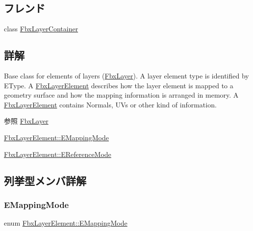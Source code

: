 \subsection*{フレンド}
\begin{DoxyCompactItemize}
\item 
class \hyperlink{class_fbx_layer_element_a791d2046ce60bf6f5fb85d9dc6242f2e}{Fbx\+Layer\+Container}
\end{DoxyCompactItemize}


\subsection{詳解}
Base class for elements of layers (\hyperlink{class_fbx_layer}{Fbx\+Layer}). A layer element type is identified by E\+Type. A \hyperlink{class_fbx_layer_element}{Fbx\+Layer\+Element} describes how the layer element is mapped to a geometry surface and how the mapping information is arranged in memory. A \hyperlink{class_fbx_layer_element}{Fbx\+Layer\+Element} contains Normals, U\+Vs or other kind of information.

\begin{DoxySeeAlso}{参照}
\hyperlink{class_fbx_layer}{Fbx\+Layer} 

\hyperlink{class_fbx_layer_element_a5a40e95db30ae9f94611dc3f1568af26}{Fbx\+Layer\+Element\+::\+E\+Mapping\+Mode} 

\hyperlink{class_fbx_layer_element_a00f04654580ca9b2f5d292c11abd83fc}{Fbx\+Layer\+Element\+::\+E\+Reference\+Mode} 
\end{DoxySeeAlso}


\subsection{列挙型メンバ詳解}
\mbox{\label{class_fbx_layer_element_a5a40e95db30ae9f94611dc3f1568af26}} 
\subsubsection{\texorpdfstring{E\+Mapping\+Mode}{EMappingMode}}
{\footnotesize\ttfamily enum \hyperlink{class_fbx_layer_element_a5a40e95db30ae9f94611dc3f1568af26}{Fbx\+Layer\+Element\+::\+E\+Mapping\+Mode}}

